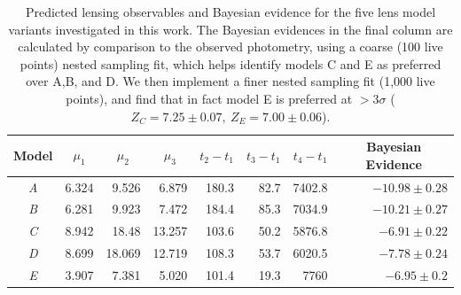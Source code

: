 \documentclass[12pt]{article}
\def\SNABC{AT 2016tbd\xspace}
\begin{document}
{%

\begin{table}[ht]
\begin{tabular}{crrrrrrr}
    
    
    \multicolumn{1}{c}{Model} &\multicolumn{1}{c}{$\mu_1$} & \multicolumn{1}{c}{$\mu_2$} &\multicolumn{1}{c}{$\mu_3$} &\multicolumn{1}{c}{$t_2-t_1$} & \multicolumn{1}{c}{$t_3-t_1$}& \multicolumn{1}{c}{$t_4-t_1$} & \multicolumn{1}{c}{Bayesian Evidence}\\
\midrule
\textit{A} & 6.324 & 9.526 & 6.879 & 180.3 & 82.7&7402.8&$-10.98\pm0.28$ \\
\textit{B} & 6.281 & 9.923 & 7.472 & 184.4 & 85.3&7034.9&$-10.21\pm0.27$ \\
\textit{C} &8.942  & 18.48 & 13.257 & 103.6 & 50.2&5876.8&$-6.91\pm0.22$ \\
\textit{D} & 8.699 & 18.069 & 12.719 & 108.3 & 53.7&6020.5&$-7.78\pm0.24$ \\
\textit{E} & 3.907 & 7.381 & 5.020 & 101.4 & 19.3&7760&$-6.95\pm0.2$ \\
\end{tabular}
\caption{\label{tab:model_evidence}Predicted lensing observables and Bayesian evidence for the five lens model variants investigated in this work. The Bayesian evidences in the final column are calculated by comparison to the observed photometry, using a coarse (100 live points) nested sampling fit, which helps identify models C and E as preferred over A,B, and D. We then implement a finer nested sampling fit (1,000 live points), and find that in fact model E is preferred at $>3\sigma$ ($Z_C=7.25\pm0.07, \ Z_E=7.00\pm0.06$).}
\end{table}

}
\end{document}
